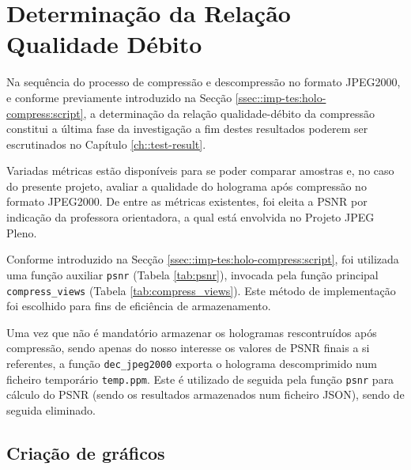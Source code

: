 \section{Determinação da Relação Qualidade Débito}
\label{sec::imp-test:psnr}



Na sequência do processo de compressão e descompressão no formato JPEG2000, e conforme previamente introduzido na Secção \ref{ssec::imp-tes:holo-compress:script}, a determinação da relação qualidade-débito da compressão constitui a última fase da investigação a fim destes resultados poderem ser escrutinados no Capítulo \ref{ch::test-result}.

Variadas métricas estão disponíveis para se poder comparar amostras e, no caso do presente projeto, avaliar a qualidade do holograma após compressão no formato JPEG2000. De entre as métricas existentes, foi eleita a \acf{PSNR} por indicação da professora orientadora, a qual está envolvida no Projeto JPEG Pleno.

Conforme introduzido na Secção \ref{ssec::imp-tes:holo-compress:script}, foi utilizada uma função auxiliar \verb|psnr| (Tabela \ref{tab:psnr}), invocada pela função principal \verb|compress_views| (Tabela \ref{tab:compress_views}). Este método de implementação foi escolhido para fins de eficiência de armazenamento.

Uma vez que não é mandatório armazenar os hologramas rescontruídos após compressão, sendo apenas do nosso interesse os valores de \ac{PSNR} finais a si referentes, a função \verb|dec_jpeg2000| exporta o holograma descomprimido num ficheiro temporário \verb|temp.ppm|. Este é utilizado de seguida pela função \verb|psnr| para cálculo do \ac{PSNR} (sendo os resultados armazenados num ficheiro \ac{JSON}), sendo de seguida eliminado.


\subsection{Criação de gráficos}
\label{ssec::imp-test:psnr:graf}

